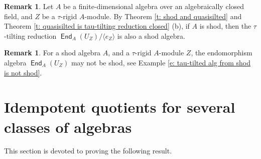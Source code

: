 \documentclass[12pt,a4paper,reqno]{amsart}
\theoremstyle{definition}
\newtheorem{remark}[theorem]{Remark}
\newcommand{\opname}[1]{\operatorname{\mathsf{#1}}}
\newcommand{\End}{\opname{End}}
\begin{document}
\begin{remark} \label{r: shod is tau-tilting reduction closed} Let $A$ be a finite-dimensional algebra over an algebraically closed field, and $Z$ be a $\tau$-rigid $A$-module. By Theorem \ref{t: shod and quasisilted} and Theorem \ref{t: quasisilted is tau-tilting reduction closed} (b), if $A$ is shod, then the $\tau$-tilting reduction $\End_A (U_Z) / \langle e_Z \rangle$ is also a shod algebra.
\end{remark}

\begin{remark} \label{c: tau-tilted from shod} For a shod algebra $A$, and a $\tau$-rigid $A$-module $Z$, the endomorphism algebra $\End_A (U_Z)$ may not  be shod, see Example \ref{e: tau-tilted alg from shod is not shod}.
\end{remark}


\section{Idempotent quotients for several classes of algebras} \label{s: Quotient-closed property by idempotents} This section is devoted to proving the following result.
\end{document}
